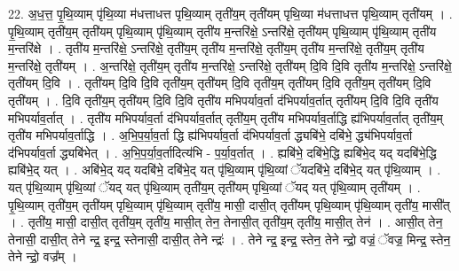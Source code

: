 \documentclass[17pt]{extarticle}
\begin{document}
22. अ॒ध॒त्त॒ पृ॒थि॒व्याम् पृ॑थि॒व्या म॑धत्ताधत्त पृथि॒व्याम् तृती॑य॒म् तृती॑यम् पृथि॒व्या म॑धत्ताधत्त पृथि॒व्याम् तृती॑यम् । . पृ॒थि॒व्याम् तृती॑य॒म् तृती॑यम् पृथि॒व्याम् पृ॑थि॒व्याम् तृती॑य म॒न्तरि॑क्षे॒ ऽन्तरि॑क्षे॒ तृती॑यम् पृथि॒व्याम् पृ॑थि॒व्याम् तृती॑य म॒न्तरि॑क्षे । . तृती॑य म॒न्तरि॑क्षे॒ ऽन्तरि॑क्षे॒ तृती॑य॒म् तृती॑य म॒न्तरि॑क्षे॒ तृती॑य॒म् तृती॑य म॒न्तरि॑क्षे॒ तृती॑य॒म् तृती॑य म॒न्तरि॑क्षे॒ तृती॑यम् । . अ॒न्तरि॑क्षे॒ तृती॑य॒म् तृती॑य म॒न्तरि॑क्षे॒ ऽन्तरि॑क्षे॒ तृती॑यम् दि॒वि दि॒वि तृती॑य म॒न्तरि॑क्षे॒ ऽन्तरि॑क्षे॒ तृती॑यम् दि॒वि । . तृती॑यम् दि॒वि दि॒वि तृती॑य॒म् तृती॑यम् दि॒वि तृती॑य॒म् तृती॑यम् दि॒वि तृती॑य॒म् तृती॑यम् दि॒वि तृती॑यम् । . दि॒वि तृती॑य॒म् तृती॑यम् दि॒वि दि॒वि तृती॑य मभिपर्याव॒र्ता द॑भिपर्याव॒र्तात् तृती॑यम् दि॒वि दि॒वि तृती॑य मभिपर्याव॒र्तात् । . तृती॑य मभिपर्याव॒र्ता द॑भिपर्याव॒र्तात् तृती॑य॒म् तृती॑य मभिपर्याव॒र्ताद्धि ह्य॑भिपर्याव॒र्तात् तृती॑य॒म् तृती॑य मभिपर्याव॒र्ताद्धि । . अ॒भि॒प॒र्या॒व॒र्ता द्धि ह्य॑भिपर्याव॒र्ता द॑भिपर्याव॒र्ता द्ध्यबि॑भे॒ दबि॑भे॒ द्ध्य॑भिपर्याव॒र्ता द॑भिपर्याव॒र्ता द्ध्यबि॑भेत् । . अ॒भि॒प॒र्या॒व॒र्तादित्य॑भि - प॒र्या॒व॒र्तात् । . ह्यबि॑भे॒ दबि॑भे॒द्धि ह्यबि॑भे॒द् यद् यदबि॑भे॒द्धि ह्यबि॑भे॒द् यत् । . अबि॑भे॒द् यद् यदबि॑भे॒ दबि॑भे॒द् यत् पृ॑थि॒व्याम् पृ॑थि॒व्यां ॅयदबि॑भे॒ दबि॑भे॒द् यत् पृ॑थि॒व्याम् । . यत् पृ॑थि॒व्याम् पृ॑थि॒व्यां ॅयद् यत् पृ॑थि॒व्याम् तृती॑य॒म् तृती॑यम् पृथि॒व्यां ॅयद् यत् पृ॑थि॒व्याम् तृती॑यम् । . पृ॒थि॒व्याम् तृती॑य॒म् तृती॑यम् पृथि॒व्याम् पृ॑थि॒व्याम् तृती॑य॒ मासी॒ दासी॒त् तृती॑यम् पृथि॒व्याम् पृ॑थि॒व्याम् तृती॑य॒ मासी᳚त् । . तृती॑य॒ मासी॒ दासी॒त् तृती॑य॒म् तृती॑य॒ मासी॒त् तेन॒ तेनासी॒त् तृती॑य॒म् तृती॑य॒ मासी॒त् तेन॑ । . आसी॒त् तेन॒ तेनासी॒ दासी॒त् तेने न्द्र॒ इन्द्र॒ स्तेनासी॒ दासी॒त् तेने न्द्रः॑ । . तेने न्द्र॒ इन्द्र॒ स्तेन॒ तेने न्द्रो॒ वज्रं॒ ॅवज्र॒ मिन्द्र॒ स्तेन॒ तेने न्द्रो॒ वज्र᳚म् । \newline
\end{document}
